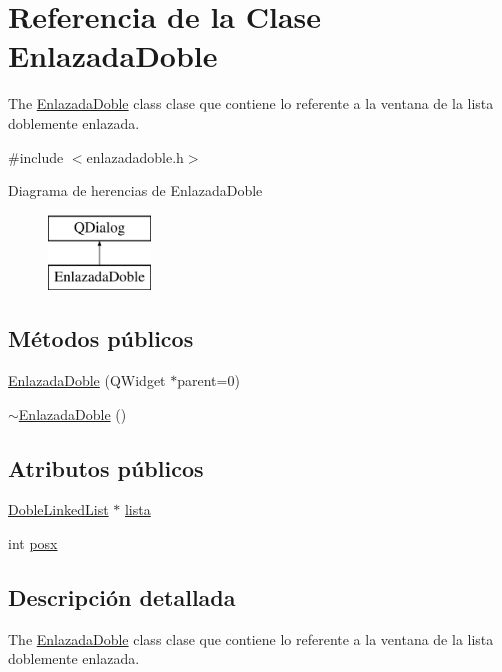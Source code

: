 \hypertarget{class_enlazada_doble}{}\section{Referencia de la Clase Enlazada\+Doble}
\label{class_enlazada_doble}


The \mbox{\hyperlink{class_enlazada_doble}{Enlazada\+Doble}} class clase que contiene lo referente a la ventana de la lista doblemente enlazada.  




{\ttfamily \#include $<$enlazadadoble.\+h$>$}

Diagrama de herencias de Enlazada\+Doble\begin{figure}[H]
\begin{center}
\leavevmode
\includegraphics[height=2.000000cm]{class_enlazada_doble}
\end{center}
\end{figure}
\subsection*{Métodos públicos}
\begin{DoxyCompactItemize}
\item 
\mbox{\hyperlink{class_enlazada_doble_a5b55fdc97b66257ed864966d19a27439}{Enlazada\+Doble}} (Q\+Widget $\ast$parent=0)
\item 
\mbox{\hyperlink{class_enlazada_doble_a570a769129249be3c786e6ac21253bb8}{$\sim$\+Enlazada\+Doble}} ()
\end{DoxyCompactItemize}
\subsection*{Atributos públicos}
\begin{DoxyCompactItemize}
\item 
\mbox{\hyperlink{class_doble_linked_list}{Doble\+Linked\+List}} $\ast$ \mbox{\hyperlink{class_enlazada_doble_a041d141e37c6efade1cae5ea9f5d982c}{lista}}
\item 
int \mbox{\hyperlink{class_enlazada_doble_ac4cff0c052eef87b0211923a625daa4d}{posx}}
\end{DoxyCompactItemize}


\subsection{Descripción detallada}
The \mbox{\hyperlink{class_enlazada_doble}{Enlazada\+Doble}} class clase que contiene lo referente a la ventana de la lista doblemente enlazada. 

